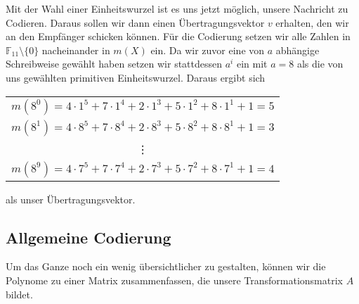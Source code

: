 Mit der Wahl einer Einheitswurzel ist es uns jetzt möglich, unsere Nachricht zu Codieren. Daraus sollen wir dann einen Übertragungsvektor $v$ erhalten, den wir an den Empfänger schicken können. 
Für die Codierung setzen wir alle Zahlen in $\mathbb{F}_{11}\setminus\{0\}$ nacheinander in $m(X)$ ein. Da wir zuvor eine von $a$ abhängige Schreibweise gewählt haben setzen wir stattdessen $a^i$ ein mit $a = 8$ als die von uns gewählten primitiven Einheitswurzel. Daraus ergibt sich
%
%
\begin{center}
	\begin{tabular}{c}
		$m(8^0) = 4 \cdot 1^5 + 7 \cdot 1^4 + 2 \cdot 1^3 + 5 \cdot 1^2 + 8 \cdot 1^1 + 1 = 5$ \\
		$m(8^1) = 4 \cdot 8^5 + 7 \cdot 8^4 + 2 \cdot 8^3 + 5 \cdot 8^2 + 8 \cdot 8^1 + 1 = 3$ \\
		\vdots \\
		$m(8^9) = 4 \cdot 7^5 + 7 \cdot 7^4 + 2 \cdot 7^3 + 5 \cdot 7^2 + 8 \cdot 7^1 + 1 = 4$
	\end{tabular}
\end{center}
als unser Übertragungsvektor. 
%

\subsection{Allgemeine Codierung
	\label{reedsolomon:subsection:algCod}}
Um das Ganze noch ein wenig übersichtlicher zu gestalten, können wir die Polynome zu einer Matrix zusammenfassen, die unsere Transformationsmatrix $A$ bildet.

